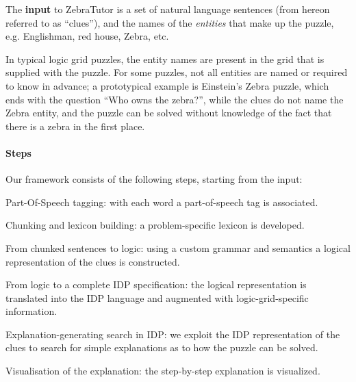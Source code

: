 \documentclass[runningheads]{llncs}
\newcommand{\zebratutor}{ZebraTutor\xspace}
\newcommand{\ourtool}{\zebratutor}
\newcommand{\idp}{IDP\xspace}
\begin{document}
The \textbf{input} to \ourtool is a set of natural language sentences (from hereon referred to as ``clues''), and the names of the \textit{entities} that make up the puzzle, e.g. Englishman, red house, Zebra, etc. %

In typical logic grid puzzles, the entity names are present in the grid that is supplied with the puzzle. For some puzzles, not all entities are named or required to know in advance; a prototypical example is Einstein's Zebra puzzle, which ends with the question ``Who owns the zebra?'', while the clues do not name the Zebra entity, and the puzzle can be solved without knowledge of the fact that there is a zebra in the first place. 

%



\paragraph{Steps}
Our framework consists of the following steps, starting from the input:
\begin{compactenum}
\item Part-Of-Speech tagging: with each word a part-of-speech tag is associated.
\item Chunking and lexicon building: a problem-specific lexicon is developed.
\item From chunked sentences to logic: using a custom grammar and semantics a logical representation of the clues is constructed.
 \item From logic to a complete IDP specification: the logical representation is translated into the \idp language and augmented with logic-grid-specific information. \label{step:toidp}
\item Explanation-generating search in IDP: we exploit the \idp representation of the clues to search for simple explanations as to how the puzzle can be solved.
\item Visualisation of the explanation: the step-by-step explanation is visualized.
\end{compactenum}
% 
% 
\end{document}
